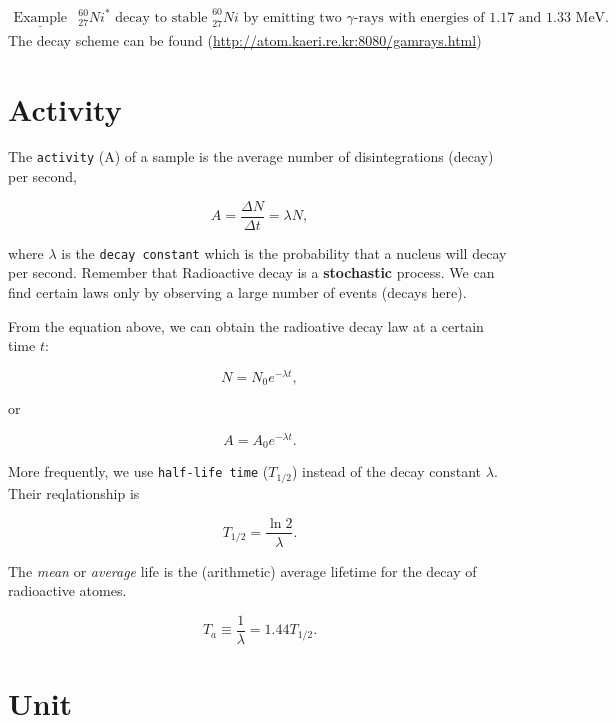 \documentclass[]{book}
\theoremstyle{definition}
\theoremstyle{definition}
\theoremstyle{definition}
\theoremstyle{remark}
\begin{document}
\[
\begin{matrix}
\underline{\text{Example}} & _{27}^{60}Ni^{*} \text{ decay to stable }_{27}^{60}Ni \text{ by emitting two } \gamma \text{-rays with energies of 1.17 and 1.33 MeV.}
\end{matrix}
\] The decay scheme can be found
(\url{http://atom.kaeri.re.kr:8080/gamrays.html})

\section{Activity}\label{activity}

The \texttt{activity} (A) of a sample is the average number of
disintegrations (decay) per second,

\begin{equation}
A = \frac{\Delta N}{\Delta t} = \lambda N,
\end{equation}

where \(\lambda\) is the \texttt{decay\ constant} which is the
probability that a nucleus will decay per second. Remember that
Radioactive decay is a \textbf{stochastic} process. We can find certain
laws only by observing a large number of events (decays here).

From the equation above, we can obtain the radioative decay law at a
certain time \(t\):

\begin{equation}
N = N_0 e^{-\lambda t},
\label{eq:decay1}
\end{equation}

or

\begin{equation}
A = A_0 e^{-\lambda t}. 
\label{eq:decay2}
\end{equation}

More frequently, we use \texttt{half-life\ time} (\(T_{1/2}\)) instead
of the decay constant \(\lambda\). Their reqlationship is

\begin{equation}
  T_{1/2} = \frac{\ln 2}{\lambda}.
  \label{eq:halflife}
\end{equation}

The \emph{mean} or \emph{average} life is the (arithmetic) average
lifetime for the decay of radioactive atomes.

\begin{equation}
  T_{a} \equiv \frac{1}{\lambda} = 1.44T_{1/2}.
    \label{eq:avelife}
\end{equation}

\section{Unit}\label{decay-unit}
\end{document}
